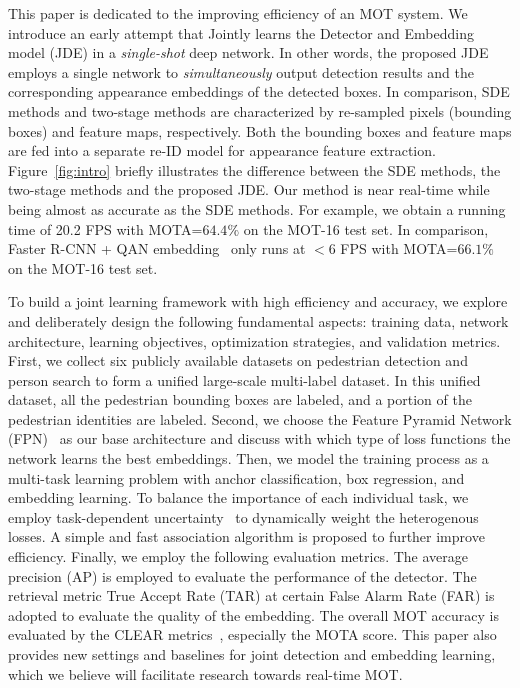 \documentclass[runningheads]{llncs}
\begin{document}
This paper is dedicated to the improving efficiency of an MOT system. We introduce an early attempt that Jointly learns the Detector and Embedding model (JDE) in a \emph{single-shot} deep network. In other words, the proposed JDE employs a single network to \emph{simultaneously} output detection results and the corresponding appearance embeddings of the detected boxes. In comparison, SDE methods and two-stage methods are characterized by re-sampled pixels (bounding boxes) and feature maps, respectively. Both the bounding boxes and feature maps are fed into a separate re-ID model for appearance feature extraction. Figure~\ref{fig:intro} briefly illustrates the difference between the SDE methods, the two-stage methods and the proposed JDE. Our method is near real-time while being  almost as accurate as the SDE methods. For example, we obtain a running time of 20.2 FPS with MOTA=$64.4\%$ on the MOT-16 test set. In comparison, Faster R-CNN + QAN embedding~\cite{poi} only runs at $<$6 FPS with MOTA=$66.1\%$ on the MOT-16 test set. 



To build a joint learning framework with high efficiency and accuracy, we explore and deliberately design the following fundamental aspects:  training data, network architecture,  learning objectives, optimization strategies, and validation metrics.
First, we collect six publicly available datasets on pedestrian detection and person search to form a unified large-scale multi-label dataset. In this unified dataset, all the pedestrian bounding boxes are labeled, and a portion of the pedestrian identities are labeled. Second, we choose the Feature Pyramid Network (FPN)~\cite{fpn} as our base architecture and discuss with which type of loss functions the network learns the best embeddings. Then, we model the training process as a multi-task learning problem with anchor classification, box regression, and embedding learning. To balance the importance of each individual task, we employ task-dependent uncertainty~\cite{uncertainty} to dynamically weight the heterogenous losses.
A simple and fast association algorithm is proposed to further improve efficiency. 
Finally, we employ the following evaluation metrics. The average precision (AP) is employed to evaluate the performance of the detector. The retrieval metric True Accept Rate (TAR) at certain False Alarm Rate (FAR) is adopted to evaluate the quality of the embedding. The overall MOT accuracy is evaluated by the CLEAR metrics~\cite{CLEAR}, especially the MOTA score. This paper also provides  new settings and baselines for  joint detection and embedding learning, which we believe will facilitate research towards real-time MOT. 
\end{document}
